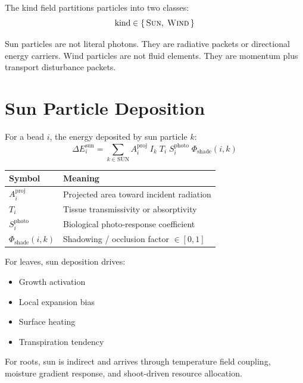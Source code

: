 \documentclass[11pt]{article}
\begin{document}
The kind field partitions particles into two classes:
\begin{equation}
  \mathrm{kind} \in \{\,\textsc{Sun},\;\textsc{Wind}\,\}
\end{equation}

Sun particles are not literal photons.  They are radiative packets or
directional energy carriers.  Wind particles are not fluid elements.
They are momentum plus transport disturbance packets.

\section{Sun Particle Deposition}

For a bead $i$, the energy deposited by sun particle $k$:
\begin{equation}
  \Delta E_i^{\mathrm{sun}} = \sum_{k \in \mathrm{SUN}}
    A_i^{\mathrm{proj}}\;I_k\;T_i\;S_i^{\mathrm{photo}}\;
    \Phi_{\mathrm{shade}}(i, k)
  \label{eq:sun}
\end{equation}

\begin{center}
\begin{tabular}{ll}
\toprule
\textbf{Symbol} & \textbf{Meaning} \\
\midrule
$A_i^{\mathrm{proj}}$ & Projected area toward incident radiation \\
$T_i$ & Tissue transmissivity or absorptivity \\
$S_i^{\mathrm{photo}}$ & Biological photo-response coefficient \\
$\Phi_{\mathrm{shade}}(i,k)$ & Shadowing / occlusion factor $\in [0,1]$ \\
\bottomrule
\end{tabular}
\end{center}

For leaves, sun deposition drives:
\begin{itemize}
  \item Growth activation
  \item Local expansion bias
  \item Surface heating
  \item Transpiration tendency
\end{itemize}

For roots, sun is indirect and arrives through temperature field
coupling, moisture gradient response, and shoot-driven resource
allocation.
\end{document}
